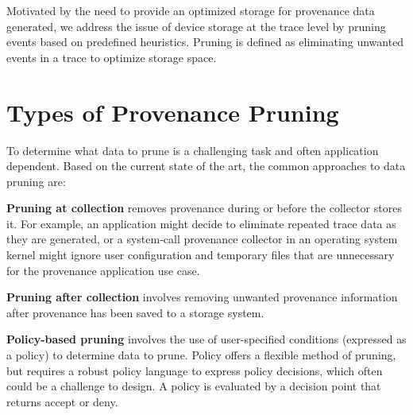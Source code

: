Motivated by the need to provide an optimized storage for provenance data generated, we address the issue of device storage at the trace level by pruning events based on predefined heuristics. Pruning is defined as eliminating unwanted events in a trace to optimize storage space. %

\section{Types of Provenance Pruning} 
To determine what data to prune is a challenging task and often application dependent. %
Based on the current state of the art, the common approaches to data pruning are:
 
\textbf{Pruning at collection} removes provenance during or before the collector stores it. For example, an application might decide to eliminate repeated trace data as they are generated, or a system-call provenance collector in an operating system kernel might ignore user configuration and temporary files that are unnecessary for the provenance application use case.

\textbf{Pruning after collection}  involves removing unwanted provenance information after provenance has been saved to a storage system. %

\textbf{Policy-based pruning} \cite{Bates:2015:TOY:2814579.2814586} involves the use of user-specified conditions (expressed as a policy) to determine data to prune. Policy offers a flexible method of pruning, but requires a robust policy language to express policy decisions, which often could be a challenge to design. A policy is evaluated by a decision point  that returns accept or deny. %


